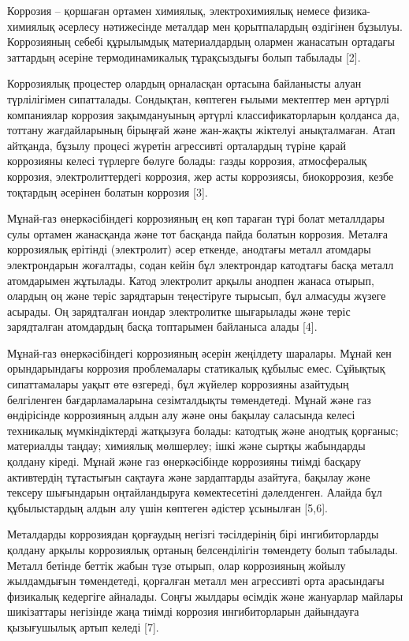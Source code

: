 Коррозия -- қоршаған ортамен химиялық, электрохимиялық немесе
физика-химиялық әсерлесу нәтижесінде металдар мен қорытпалардың
өздігінен бұзылуы. Коррозияның себебі құрылымдық материалдардың олармен
жанасатын ортадағы заттардың әсеріне термодинамикалық тұрақсыздығы болып
табылады {[}2{]}.

Коррозиялық процестер олардың орналасқан ортасына байланысты алуан
түрлілігімен сипатталады. Сондықтан, көптеген ғылыми мектептер мен
әртүрлі компаниялар коррозия зақымдануының әртүрлі классификаторларын
қолданса да, тоттану жағдайларының бірыңғай және жан-жақты жіктелуі
анықталмаған. Атап айтқанда, бұзылу процесі жүретін агрессивті
орталардың түріне қарай коррозияны келесі түрлерге бөлуге болады: газды
коррозия, атмосфералық коррозия, электролиттердегі коррозия, жер асты
коррозиясы, биокоррозия, кезбе тоқтардың әсерінен болатын коррозия
{[}3{]}.

Мұнай-газ өнеркәсібіндегі коррозияның ең көп тараған түрі болат
металлдары сулы ортамен жанасқанда және тот басқанда пайда болатын
коррозия. Металға коррозиялық ерітінді (электролит) әсер еткенде,
анодтағы металл атомдары электрондарын жоғалтады, содан кейін бұл
электрондар катодтағы басқа металл атомдарымен жұтылады. Катод
электролит арқылы анодпен жанаса отырып, олардың оң және теріс
зарядтарын теңестіруге тырысып, бұл алмасуды жүзеге асырады. Оң
зарядталған иондар электролитке шығарылады және теріс зарядталған
атомдардың басқа топтарымен байланыса алады {[}4{]}.

Мұнай-газ өнеркәсібіндегі коррозияның әсерін жеңілдету шаралары. Мұнай
кен орындарындағы коррозия проблемалары статикалық құбылыс емес.
Сұйықтық сипаттамалары уақыт өте өзгереді, бұл жүйелер коррозияны
азайтудың белгіленген бағдарламаларына сезімталдықты төмендетеді. Мұнай
және газ өндірісінде коррозияның алдын алу және оны бақылау саласында
келесі техникалық мүмкіндіктерді жатқызуға болады: катодтық және анодтық
қорғаныс; материалды таңдау; химиялық мөлшерлеу; ішкі және сыртқы
жабындарды қолдану кіреді. Мұнай және газ өнеркәсібінде коррозияны
тиімді басқару активтердің тұтастығын сақтауға және зардаптарды
азайтуға, бақылау және тексеру шығындарын оңтайландыруға көмектесетіні
дәлелденген. Алайда бұл құбылыстардың алдын алу үшін көптеген әдістер
ұсынылған {[}5,6{]}.

Металдарды коррозиядан қорғаудың негізгі тәсілдерінің бірі
ингибиторларды қолдану арқылы коррозиялық ортаның белсенділігін
төмендету болып табылады. Металл бетінде беттік жабын түзе отырып, олар
коррозияның жойылу жылдамдығын төмендетеді, қорғалған металл мен
агрессивті орта арасындағы физикалық кедергіге айналады. Соңғы жылдары
өсімдік және жануарлар майлары шикізаттары негізінде жаңа тиімді
коррозия ингибиторларын дайындауға қызығушылық артып келеді {[}7{]}.

